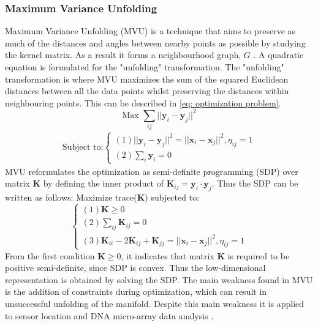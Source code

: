 \documentclass[11pt]{article}
\begin{document}
	\subsubsection{Maximum Variance Unfolding}
	Maximum Variance Unfolding (MVU) is a technique that aims to preserve as much of the distances and angles between nearby points as possible by studying the kernel matrix. As a result it forms a neighbourhood graph, $G$ \cite{Jiang2011}. A quadratic equation is formulated for the "unfolding" transformation. The "unfolding" transformation is where MVU maximizes the sum of the squared Euclidean distances between all the data points whilst preserving the distances within neighbouring points. This can be described in \eqref{eq: optimization problem}.
	\begin{equation}
		\text{Max } \sum_{ij}||\textbf{y}_i - \textbf{y}_j||^{2}
		\label{eq: optimization problem}
	\end{equation}
	\begin{align*}
		\text{Subject to:}
		\begin{cases}
			(1)||\textbf{y}_i - \textbf{y}_j||^{2} = ||\textbf{x}_i - \textbf{x}_j||^{2} , \eta_{ij} = 1 \\
			(2)\sum_{i}\textbf{y}_i = 0
		\end{cases}
	\end{align*}
	MVU reformulates the optimization as semi-definite programming (SDP) over matrix $\textbf{K}$ by defining the inner product of $\textbf{K}_{ij} = \textbf{y}_i \cdot \textbf{y}_j$. Thus the SDP can be written as follows: 
	\newline
	Maximize trace(\textbf{K}) subjected to:
	\begin{equation}
		\begin{cases}
			(1) \textbf{K} \geq 0 \\
			(2) \sum_{ij} \textbf{K}_{ij} = 0 \\
			(3) \textbf{K}_{ii} - 2\textbf{K}_{ij} + \textbf{K}_{jj} = ||\textbf{x}_i - \textbf{x}_j||^{2}, \eta_{ij} = 1
		\end{cases}
	\end{equation} 
	From the first condition $\textbf{K} \geq 0$, it indicates that matrix $\textbf{K}$ is required to be positive semi-definite, since SDP is convex. Thus the low-dimensional representation is obtained by solving the SDP. The main weakness found in MVU is the addition of constraints during optimization, which can result in unsuccessful unfolding of the manifold. Despite this main weakness it is applied to sensor location and DNA micro-array data analysis \cite{van2009dimensionality}.
	
\end{document}
